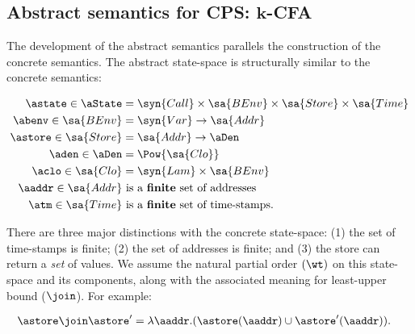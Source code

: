 \subsection{Abstract semantics for CPS: $\boldsymbol k$-CFA}

The development of the abstract semantics parallels the construction
of the concrete semantics.
The abstract state-space is structurally similar to the concrete
semantics:
\begin{small}\begin{align*}
  \astate \in \aState &=
  \syn{Call} \times 
  \sa{BEnv} \times 
  \sa{Store} \times
  \sa{Time}
  \\
  \abenv \in \sa{BEnv} &= \syn{Var} \to \sa{Addr}
  \\
  \astore \in \sa{Store} &= \sa{Addr} \to \aDen
  \\
  \aden \in \aDen &= \Pow{\sa{Clo}}
  \\
  \aclo \in \sa{Clo} &= \syn{Lam} \times \sa{BEnv}
  \\
  \aaddr \in \sa{Addr} &\text{ is a \textbf{finite} set of addresses}
  \\
  \atm \in \sa{Time} &\text{ is a \textbf{finite} set of time-stamps}
  \text.
\end{align*}\end{small}There are three major distinctions with the concrete state-space: (1)
the set of time-stamps is finite; (2) the set of addresses is finite;
and (3) the store can return a \emph{set} of values.
We assume the natural partial order $(\wt)$ on this state-space
and its components, along with the associated meaning for least-upper
bound ($\join$).  
For example:
\begin{small}\begin{align*}
  \astore \join \astore' &= \lambda \aaddr .( \astore(\aaddr) \cup
  \astore'(\aaddr) )
  \text.
\end{align*}\end{small}





